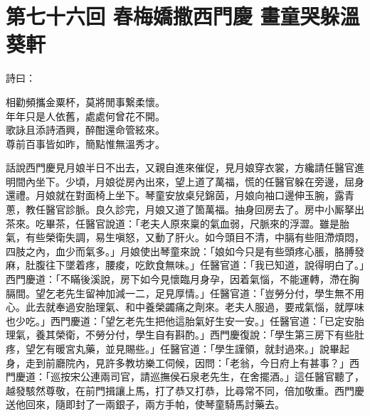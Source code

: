 
\chapter*{第七十六回 春梅嬌撒西門慶 畫童哭躲溫葵軒}


詩曰：

\begin{myquote} 
相勸頻攜金粟杯，莫將閒事繋柔懷。\\年年只是人依舊，處處何曾花不開。\\歌詠且添詩酒興，醉酣還命管絃來。\\尊前百事皆如昨，簡點惟無溫秀才。
\end{myquote} 

話說西門慶見月娘半日不出去，又親自進來催促，見月娘穿衣裳，方纔請任醫官進明間內坐下。{}少頃，月娘從房內出來，望上道了萬福，慌的任醫官躲在旁邊，屈身還禮。月娘就在對面椅上坐下。琴童安放桌兒錦茵，月娘向袖口邊伸玉腕，露青蔥，教任醫官診脈。良久診完，月娘又道了箇萬福。抽身回房去了。房中小厮拏出茶來。吃畢茶，任醫官說道：「老夫人原來稟的氣血弱，尺脈來的浮澀。雖是胎氣，有些榮衛失調，易生嗔怒，又動了肝火。如今頭目不清，中膈有些阻滯煩悶，四肢之內，血少而氣多。」{}月娘使出琴童來說：「娘如今只是有些頭疼心脹，胳膊發麻，肚腹往下墜着疼，腰痠，吃飲食無味。」任醫官道：「我已知道，說得明白了。」西門慶道：「不瞞後溪說，房下如今見懷臨月身孕，因着氣惱，不能運轉，滯在胸膈間。望乞老先生留神加減一二，足見厚情。」{}任醫官道：「豈勞分付，學生無不用心。此去就奉過安胎理氣、和中養榮蠲痛之劑來。老夫人服過，要戒氣惱，{}就厚味也少吃。」西門慶道：「望乞老先生把他這胎氣好生安一安。」任醫官道：「已定安胎理氣，養其榮衛，不勞分付，學生自有斟酌。」西門慶復說：「學生第三房下有些肚疼，望乞有暖宮丸藥，並見賜些。」任醫官道：「學生謹領，就封過來。」說畢起身，走到前廳院內，見許多教坊樂工伺候，因問：「老翁，今日府上有甚事？」西門慶道：「巡按宋公連兩司官，請巡撫侯石泉老先生，在舍擺酒。」這任醫官聽了，越發駭然尊敬，在前門揖讓上馬，打了恭又打恭，比尋常不同，倍加敬重。西門慶送他回來，隨即封了一兩銀子，兩方手帕，使琴童騎馬討藥去。

